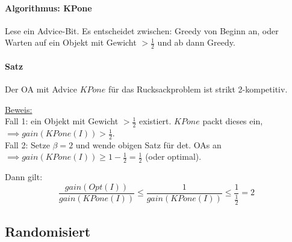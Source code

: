\paragraph{Algorithmus: KPone}
Lese ein Advice-Bit. Es entscheidet zwischen: Greedy von Beginn an, oder Warten auf ein Objekt
mit Gewicht $> \frac{1}{2}$ und ab dann Greedy.

\paragraph{Satz}
Der OA mit Advice $KPone$ für das Rucksackproblem ist strikt 2-kompetitiv.

\underline{Beweis:}
\\
Fall 1: ein Objekt mit Gewicht $> \frac{1}{2}$ existiert. $KPone$ packt dieses ein,
$\implies gain(KPone(I)) > \frac{1}{2}$.
\\
Fall 2: Setze $\beta = 2$ und wende obigen Satz für det. OAs an
$\implies gain(KPone(I)) \geq 1 - \frac{1}{2} = \frac{1}{2}$ (oder optimal).

Dann gilt:
$$ \frac{gain(Opt(I))}{gain(KPone(I))} \leq \frac{1}{gain(KPone(I))} \leq \frac{1}{\frac{1}{2}} = 2 $$



\subsection{Randomisiert}

